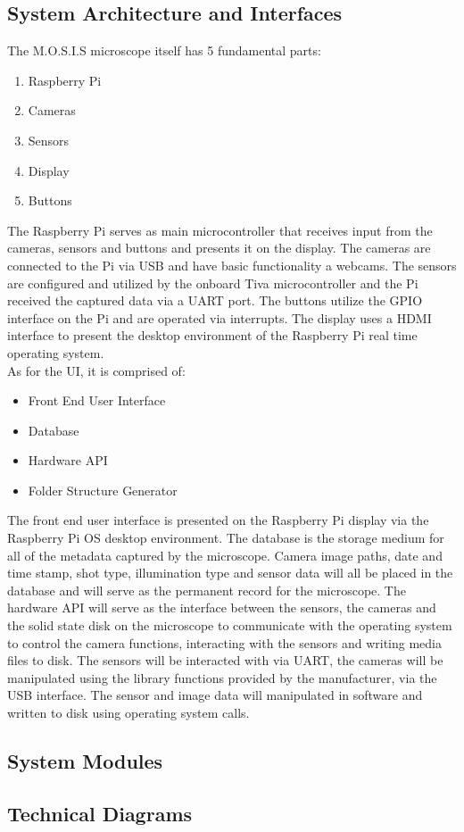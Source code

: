 \subsection{System Architecture and Interfaces}
The M.O.S.I.S microscope itself has 5 fundamental parts:
\begin{enumerate}
	\item Raspberry Pi
	\item Cameras
	\item Sensors
	\item Display
	\item Buttons
\end{enumerate}
The Raspberry Pi serves as main microcontroller that receives input from the cameras, sensors and buttons and presents it on the display.
The cameras are connected to the Pi via USB and have basic functionality a webcams. The sensors are configured and utilized by the onboard Tiva microcontroller and the Pi received the captured data via a UART port. The buttons utilize the GPIO interface on the Pi and are operated via interrupts. The display uses a HDMI interface to present the desktop environment of the Raspberry Pi real time operating system.\\
As for the UI, it is comprised of:
\begin{itemize}
	\item Front End User Interface
	\item Database
	\item Hardware API
	\item Folder Structure Generator
\end{itemize}
The front end user interface is presented on the Raspberry Pi display via the Raspberry Pi OS desktop environment. The database is the storage medium for all of the metadata captured by the microscope. Camera image paths, date and time stamp, shot type, illumination type and sensor data will all be placed in the database and will serve as the permanent record for the microscope. The hardware API will serve as the interface between the sensors, the cameras and the solid state disk on the microscope to communicate with the operating system to control the camera functions, interacting with the sensors and writing media files to disk. The sensors will be interacted with via UART, the cameras will be manipulated using the library functions provided by the manufacturer, via the USB interface. The sensor and image data will manipulated in software and written to disk using operating system calls.
\subsection{System Modules}
\subsection{Technical Diagrams}
